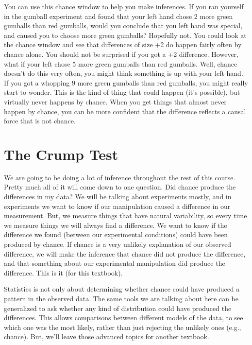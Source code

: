 \documentclass[]{book}
\newenvironment{marginnote}%
  {\itshape}%
  {}
\begin{document}
You can use this chance window to help you make inferences. If you ran yourself in the gumball experiment and found that your left hand chose 2 more green gumballs than red gumballs, would you conclude that you left hand was special, and caused you to choose more green gumballs? Hopefully not. You could look at the chance window and see that differences of size +2 do happen fairly often by chance alone. You should not be surprised if you got a +2 difference. However, what if your left chose 5 more green gumballs than red gumballs. Well, chance doesn't do this very often, you might think something is up with your left hand. If you got a whopping 9 more green gumballs than red gumballs, you might really start to wonder. This is the kind of thing that could happen (it's possible), but virtually never happens by chance. When you get things that almost never happen by chance, you can be more confident that the difference reflects a causal force that is not chance.

\hypertarget{the-crump-test}{%
\section{The Crump Test}\label{the-crump-test}}

We are going to be doing a lot of inference throughout the rest of this course. Pretty much all of it will come down to one question. Did chance produce the differences in my data? We will be talking about experiments mostly, and in experiments we want to know if our manipulation caused a difference in our measurement. But, we measure things that have natural variability, so every time we measure things we will always find a difference. We want to know if the difference we found (between our experimental conditions) could have been produced by chance. If chance is a very unlikely explanation of our observed difference, we will make the inference that chance did not produce the difference, and that something about our experimental manipulation did produce the difference. This is it (for this textbook).

\begin{marginnote}

Statistics is not only about determining whether chance could have produced a pattern in the observed data. The same tools we are talking about here can be generalized to ask whether any kind of distribution could have produced the differences. This allows comparisons between different models of the data, to see which one was the most likely, rather than just rejecting the unlikely ones (e.g., chance). But, we'll leave those advanced topics for another textbook.

\end{marginnote}
\end{document}
